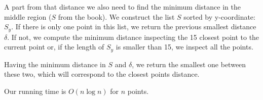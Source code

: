 \documentclass{tufte-handout}
\begin{document}
  A part from that distance we also need to find the minimum distance in the middle region ($S$ from the book). We construct the list $S$ sorted by y-coordinate: $S_y$. If there is only one point in this list, we return the previous smallest distance $\delta$. If not, we compute the minimum distance inspecting the 15 closest point to the current point or, if the length of $S_y$ is smaller than 15, we inspect all the points.
  
  Having the minimum distance in $S$ and $\delta$, we return the smallest one between these two, which will correspond to the closest points distance.

  Our running time is $O(n\log n)$ for $n$ points.
\end{document}
